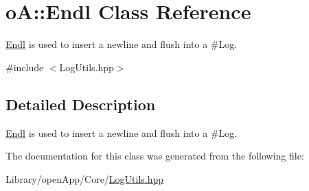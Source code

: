 \hypertarget{classo_a_1_1_endl}{}\section{oA\+:\+:Endl Class Reference}
\label{classo_a_1_1_endl}


\mbox{\hyperlink{classo_a_1_1_endl}{Endl}} is used to insert a newline and flush into a \#\+Log.  




{\ttfamily \#include $<$Log\+Utils.\+hpp$>$}



\subsection{Detailed Description}
\mbox{\hyperlink{classo_a_1_1_endl}{Endl}} is used to insert a newline and flush into a \#\+Log. 

The documentation for this class was generated from the following file\+:\begin{DoxyCompactItemize}
\item 
Library/open\+App/\+Core/\mbox{\hyperlink{_log_utils_8hpp}{Log\+Utils.\+hpp}}\end{DoxyCompactItemize}
